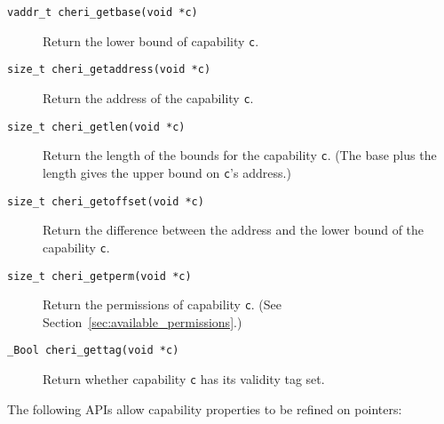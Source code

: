 \documentclass[11pt]{article}
\begin{document}
\begin{description}
\item[\texttt{vaddr\_t cheri\_getbase(void *c)}] Return the lower bound of capability
  \texttt{c}.

\item[\texttt{size\_t cheri\_getaddress(void *c)}] Return the address of the capability \texttt{c}.

\item[\texttt{size\_t cheri\_getlen(void *c)}] Return the length of the bounds for the capability \texttt{c}.
  (The base plus the length gives the upper bound on \texttt{c}'s address.)

\item[\texttt{size\_t cheri\_getoffset(void *c)}] Return the difference between the address and the lower bound of the capability \texttt{c}.

\item[\texttt{size\_t cheri\_getperm(void *c)}] Return the permissions of capability
  \texttt{c}.
  (See Section~\ref{sec:available_permissions}.)

\item[\texttt{\_Bool cheri\_gettag(void *c)}] Return whether capability \texttt{c} has its
  validity tag set.
\end{description}

\noindent
The following APIs allow capability properties to be refined on pointers:
\end{document}
